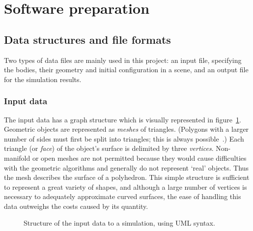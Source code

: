 \section{Software preparation\label{softwarePreparation}}

\subsection{Data structures and file formats}
Two types of data files are mainly used in this project: an input file, specifying the bodies,
their geometry and initial configuration in a scene, and an output file for the simulation
results.

\subsubsection{Input data}
The input data has a graph structure which is visually represented in figure~\ref{sceneSchema}.
Geometric objects are represented as \emph{meshes} of triangles. (Polygons with a larger number of
sides must first be split into triangles; this is always possible~\cite{Skiena:98}.) Each triangle
(or \emph{face}) of the object's surface is delimited by three \emph{vertices}. Non-manifold or
open meshes are not permitted because they would cause difficulties with the geometric algorithms
and generally do not represent `real' objects. Thus the mesh describes the surface of a polyhedron.
This simple structure is sufficient to represent a great variety of shapes, and although a large
number of vertices is necessary to adequately approximate curved surfaces, the ease of handling
this data outweighs the costs caused by its quantity.

\begin{figure}
\centerline{}
\caption{Structure of the input data to a simulation, using UML syntax.\label{sceneSchema}}
\end{figure}


